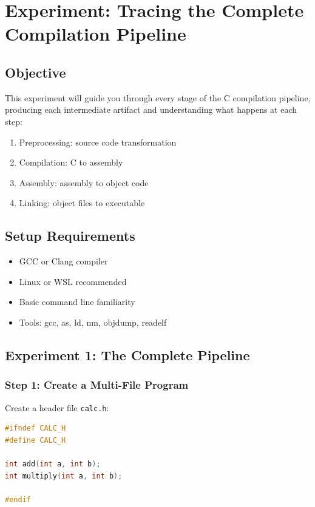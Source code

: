 \chapter{Experiment: Tracing the Complete Compilation Pipeline}

\section{Objective}

This experiment will guide you through every stage of the C compilation pipeline, producing each intermediate artifact and understanding what happens at each step:
\begin{enumerate}
\item Preprocessing: source code transformation
\item Compilation: C to assembly
\item Assembly: assembly to object code
\item Linking: object files to executable
\end{enumerate}

\section{Setup Requirements}

\begin{itemize}
\item GCC or Clang compiler
\item Linux or WSL recommended
\item Basic command line familiarity
\item Tools: gcc, as, ld, nm, objdump, readelf
\end{itemize}

\section{Experiment 1: The Complete Pipeline}

\subsection{Step 1: Create a Multi-File Program}

Create a header file \texttt{calc.h}:

\begin{lstlisting}[language=C]
#ifndef CALC_H
#define CALC_H

int add(int a, int b);
int multiply(int a, int b);

#endif
\end{lstlisting}

